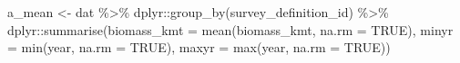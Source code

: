 \documentclass[
  letterpaper,
  oneside,
  open=any]{scrbook}
\newenvironment{Shaded}{\begin{snugshade}}{\end{snugshade}}
\newcommand{\AttributeTok}[1]{\textcolor[rgb]{0.40,0.45,0.13}{#1}}
\newcommand{\ConstantTok}[1]{\textcolor[rgb]{0.56,0.35,0.01}{#1}}
\newcommand{\FunctionTok}[1]{\textcolor[rgb]{0.28,0.35,0.67}{#1}}
\newcommand{\NormalTok}[1]{\textcolor[rgb]{0.00,0.23,0.31}{#1}}
\newcommand{\OtherTok}[1]{\textcolor[rgb]{0.00,0.23,0.31}{#1}}
\newcommand{\SpecialCharTok}[1]{\textcolor[rgb]{0.37,0.37,0.37}{#1}}
\begin{document}
\begin{Shaded}
\begin{Highlighting}[]
\NormalTok{a\_mean }\OtherTok{\textless{}{-}}\NormalTok{ dat }\SpecialCharTok{\%\textgreater{}\%} 
\NormalTok{  dplyr}\SpecialCharTok{::}\FunctionTok{group\_by}\NormalTok{(survey\_definition\_id) }\SpecialCharTok{\%\textgreater{}\%} 
\NormalTok{  dplyr}\SpecialCharTok{::}\FunctionTok{summarise}\NormalTok{(}\AttributeTok{biomass\_kmt =} \FunctionTok{mean}\NormalTok{(biomass\_kmt, }\AttributeTok{na.rm =} \ConstantTok{TRUE}\NormalTok{), }
                   \AttributeTok{minyr =} \FunctionTok{min}\NormalTok{(year, }\AttributeTok{na.rm =} \ConstantTok{TRUE}\NormalTok{), }
                   \AttributeTok{maxyr =} \FunctionTok{max}\NormalTok{(year, }\AttributeTok{na.rm =} \ConstantTok{TRUE}\NormalTok{)) }


\end{Highlighting}
\end{Shaded}
\end{document}
